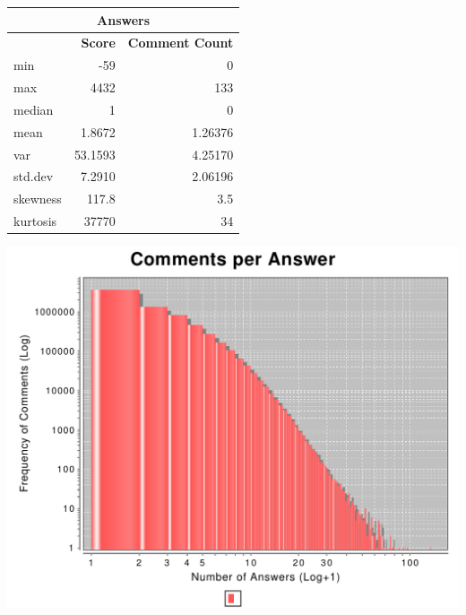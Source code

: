 \documentclass{article}
\begin{document}
\vspace{\baselineskip}

\begin{tabular}[t]{| l | r |r|} \hline
\multicolumn{3}{|c|}{Answers} \\ \hline
& \bf{Score} & \bf{Comment Count} \\ \hline 
min & -59    &   0 \\ \hline
max      &        4432  &   133 \\ \hline
median      &        1  &     0 \\ \hline
mean          &      1.8672   &    1.26376 \\ \hline
var        &        53.1593   &    4.25170 \\ \hline
std.dev      &       7.2910   &    2.06196 \\ \hline
skewness & 117.8    &       3.5  \\ \hline
kurtosis & 37770     &       34  \\ \hline
\end{tabular}

\includegraphics[width=\linewidth]{parser/answer-comments.pdf}

\vspace{\baselineskip}
\end{document}
